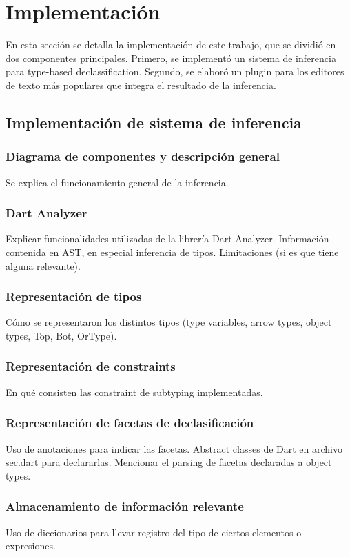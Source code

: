 \chapter{Implementación}
En esta sección se detalla la implementación de este trabajo, que se dividió en dos componentes principales. Primero, se implementó un sistema de inferencia para type-based declassification. Segundo, se elaboró un plugin para los editores de texto más populares que integra el resultado de la inferencia.

\section{Implementación de sistema de inferencia}

\subsection{Diagrama de componentes y descripción general}
Se explica el funcionamiento general de la inferencia.

\subsection{Dart Analyzer}
Explicar funcionalidades utilizadas de la librería Dart Analyzer. Información contenida en AST, en especial inferencia de tipos. Limitaciones (si es que tiene alguna relevante).

\subsection{Representación de tipos}
Cómo se representaron los distintos tipos (type variables, arrow types, object types, Top, Bot, OrType).

\subsection{Representación de constraints}
En qué consisten las constraint de subtyping implementadas.

\subsection{Representación de facetas de declasificación}
Uso de anotaciones para indicar las facetas. Abstract classes de Dart en archivo sec.dart para declararlas. Mencionar el parsing de facetas declaradas a object types.

\subsection{Almacenamiento de información relevante}
Uso de diccionarios para llevar registro del tipo de ciertos elementos o expresiones.

